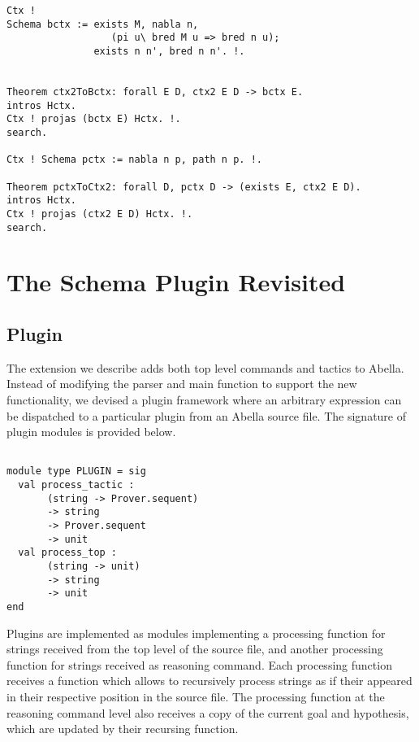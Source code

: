 \documentclass[nocopyrightspace,authoryear]{sigplanconf}
\begin{document}
\begin{itemize}
\begin{lstlisting}
Ctx !
Schema bctx := exists M, nabla n, 
                  (pi u\ bred M u => bred n u);
               exists n n', bred n n'. !.


Theorem ctx2ToBctx: forall E D, ctx2 E D -> bctx E.
intros Hctx. 
Ctx ! projas (bctx E) Hctx. !.
search.

Ctx ! Schema pctx := nabla n p, path n p. !.

Theorem pctxToCtx2: forall D, pctx D -> (exists E, ctx2 E D).
intros Hctx. 
Ctx ! projas (ctx2 E D) Hctx. !. 
search.

\end{lstlisting}


\end{itemize}

\section{The Schema Plugin Revisited}
\subsection{Plugin}
The extension we describe adds both top level commands and tactics to Abella. Instead of modifying the parser and main function to support the new functionality, we devised a plugin framework where an arbitrary expression can be dispatched to a particular plugin from an Abella source file. The signature of plugin modules is provided below.

\begin{lstlisting}

module type PLUGIN = sig 
  val process_tactic : 
       (string -> Prover.sequent) 
       -> string 
       -> Prover.sequent 
       -> unit
  val process_top : 
       (string -> unit) 
       -> string 
       -> unit
end

\end{lstlisting}

Plugins are implemented as modules implementing a processing function for strings received from the top level of the source file, and another processing function for strings received as reasoning command. Each processing function receives a function which allows to recursively process strings as if their appeared in their respective position in the source file. The processing function at the reasoning command level also receives a copy of the current goal and hypothesis, which are updated by their recursing function.
\end{document}
